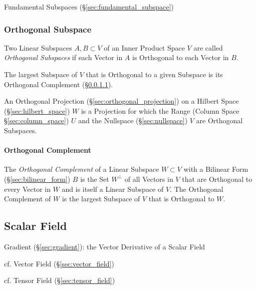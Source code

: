 \fist Fundamental Subspaces (\S\ref{sec:fundamental_subspace})



\subsubsection{Orthogonal Subspace}\label{sec:orthogonal_subspace}

Two Linear Subspaces $A, B \subset V$ of an Inner Product Space $V$ are called
\emph{Orthogonal Subspaces} if each Vector in $A$ is Orthogonal to each Vector
in $B$.

The largest Subspace of $V$ that is Orthogonal to a given Subspace is its
Orthogonal Complement (\S\ref{sec:orthogonal_complement}).

An Orthogonal Projection (\S\ref{sec:orthogonal_projection}) on a Hilbert Space
(\S\ref{sec:hilbert_space}) $W$ is a Projection for which the Range (Column
Space \S\ref{sec:column_space}) $U$ and the Nullspace (\S\ref{sec:nullspace})
$V$ are Orthogonal Subspaces.



\paragraph{Orthogonal Complement}\label{sec:orthogonal_complement}\hfill

The \emph{Orthogonal Complement} of a Linear Subspace $W \subset V$ with a
Bilinear Form (\S\ref{sec:bilinear_form}) $B$ is the Set $W^\bot$ of all
Vectors in $V$ that are Orthogonal to every Vector in $W$ and is itself a
Linear Subspace of $V$. The Orthogonal Complement of $W$ is the largest
Subspace of $V$ that is Orthogonal to $W$.



\subsection{Scalar Field}\label{sec:scalar_field}


Gradient (\S\ref{sec:gradient}): the Vector Derivative of a Scalar Field

cf. Vector Field (\S\ref{sec:vector_field})

cf. Tensor Field (\S\ref{sec:tensor_field})

